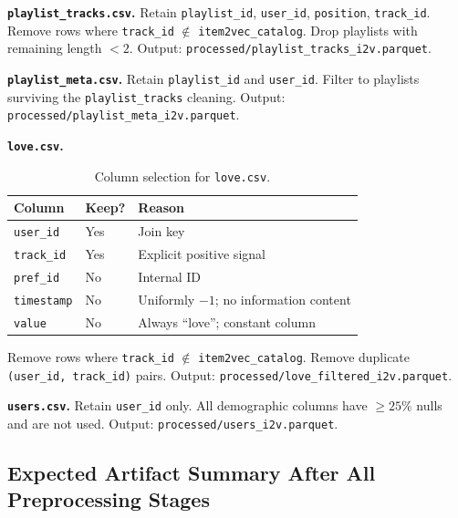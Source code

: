 \documentclass[11pt]{article}
\begin{document}
\textbf{\texttt{playlist\_tracks.csv}.}
Retain \texttt{playlist\_id}, \texttt{user\_id}, \texttt{position}, \texttt{track\_id}.
Remove rows where \texttt{track\_id} $\notin$ \texttt{item2vec\_catalog}.
Drop playlists with remaining length $< 2$.
Output: \texttt{processed/playlist\_tracks\_i2v.parquet}.

\textbf{\texttt{playlist\_meta.csv}.}
Retain \texttt{playlist\_id} and \texttt{user\_id}.
Filter to playlists surviving the \texttt{playlist\_tracks} cleaning.
Output: \texttt{processed/playlist\_meta\_i2v.parquet}.

\textbf{\texttt{love.csv}.}
\begin{table}[H]
\centering
\caption{Column selection for \texttt{love.csv}.}
\begin{tabular}{lll}
\toprule
\textbf{Column} & \textbf{Keep?} & \textbf{Reason} \\
\midrule
\texttt{user\_id}  & Yes & Join key \\
\texttt{track\_id} & Yes & Explicit positive signal \\
\texttt{pref\_id}  & No  & Internal ID \\
\texttt{timestamp} & No  & Uniformly $-1$; no information content \\
\texttt{value}     & No  & Always ``love''; constant column \\
\bottomrule
\end{tabular}
\end{table}
Remove rows where \texttt{track\_id} $\notin$ \texttt{item2vec\_catalog}.
Remove duplicate \texttt{(user\_id, track\_id)} pairs.
Output: \texttt{processed/love\_filtered\_i2v.parquet}.

\textbf{\texttt{users.csv}.}
Retain \texttt{user\_id} only. All demographic columns have $\ge 25\%$ nulls
and are not used. Output: \texttt{processed/users\_i2v.parquet}.

\subsection{Expected Artifact Summary After All Preprocessing Stages}
\end{document}
